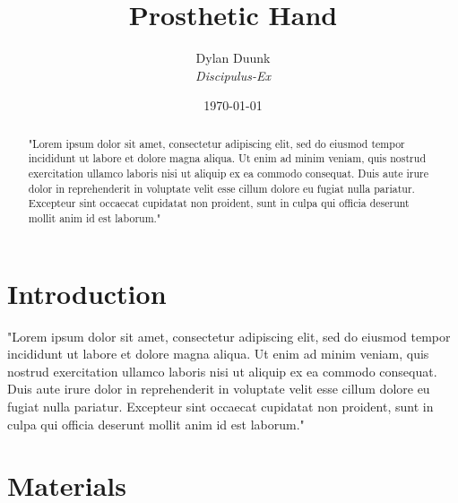 \documentclass[a4paper]{article}
\title{\Huge{Prosthetic Hand} }
\author{Dylan Duunk \\ \textit{Discipulus-Ex} }
\date{\today}
\begin{document}
\begin{titlepage}
    \maketitle
\end{titlepage}


\newpage

\begin{abstract}
    \noindent 
    "Lorem ipsum dolor sit amet, consectetur adipiscing elit, sed do eiusmod tempor incididunt ut labore et dolore magna aliqua. 
    Ut enim ad minim veniam, quis nostrud exercitation ullamco laboris nisi ut aliquip ex ea commodo consequat. 
    Duis aute irure dolor in reprehenderit in voluptate velit esse cillum dolore eu fugiat nulla pariatur. 
    Excepteur sint occaecat cupidatat non proident, sunt in culpa qui officia deserunt mollit anim id est laborum."
\end{abstract}

\newpage
\tableofcontents
\newpage
{}

\section{Introduction}
"Lorem ipsum dolor sit amet, consectetur adipiscing elit, sed do eiusmod tempor incididunt ut labore et dolore magna aliqua. 
Ut enim ad minim veniam, quis nostrud exercitation ullamco laboris nisi ut aliquip ex ea commodo consequat. 
Duis aute irure dolor in reprehenderit in voluptate velit esse cillum dolore eu fugiat nulla pariatur. 
Excepteur sint occaecat cupidatat non proident, sunt in culpa qui officia deserunt mollit anim id est laborum."

\section{Materials}
\end{document}
